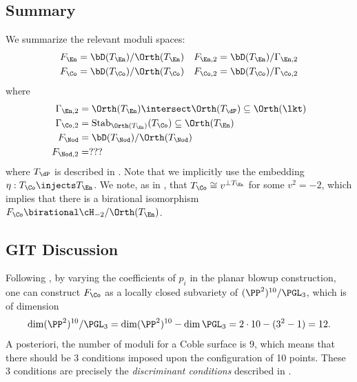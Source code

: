 \documentclass[../../main.tex]{subfiles}
\begin{document}
\subsection{Summary}
We summarize the relevant moduli spaces:
\begin{align*}
F_\En &= \bD(T_\En)/\Orth(T_\En) & 
F_{\En, 2} &= \bD(T_\En)/\Gamma_{\En, 2} \\
F_\Co &= \bD(T_\Co) / \Orth(T_\Co) & 
F_{\Co, 2} &= \bD(T_\Co)/\Gamma_{\Co, 2} 
\end{align*}
where
\begin{align*}
\Gamma_{\En, 2} &= \Orth(T_\En) \intersect \Orth(T_\dP) \subseteq \Orth(\lkt) \\
\Gamma_{\Co, 2} &= \mathrm{Stab}_{\Orth(T_\En)}(T_\Co) \subseteq \Orth(T_\En) \\
F_{\Nod} &= \bD(T_\Nod)/\Orth(T_\Nod) \\
F_{\Nod, 2} &= ???
\end{align*}
where $T_{\dP}$ is described in \cite{AEGS23}.
Note that we implicitly use the embedding $\eta: T_\Co \injects T_\En$.
We note, as in \cite{DK13}, that $T_{\Co} \cong v^{\perp T_{\En}}$ for some $v^2=-2$, which implies that there is a birational isomorphism $F_{\Co} \birational \cH_{-2}/\Orth(T_\En)$.


\subsection{GIT Discussion}

\begin{remark}
Following \cite{DK13}, by varying the coefficients of $p_i$ in the planar blowup construction, one can construct $F_\Co$ as a locally closed subvariety of $(\PP^2)^{10}/\PGL_3$, which is of dimension
\[
\dim (\PP^2)^{10}/\PGL_3 = \dim (\PP^2)^{10} - \dim \PGL_3 = 2\cdot 10 - (3^2-1) = 12
.\]
A posteriori, the number of moduli for a Coble surface is 9, which means that there should be 3 conditions imposed upon the configuration of 10 points. These 3 conditions are precisely the \textit{discriminant conditions} described in \cite[\S 2, Prop. (10)]{Cob19}. 
\end{remark}
\end{document}

